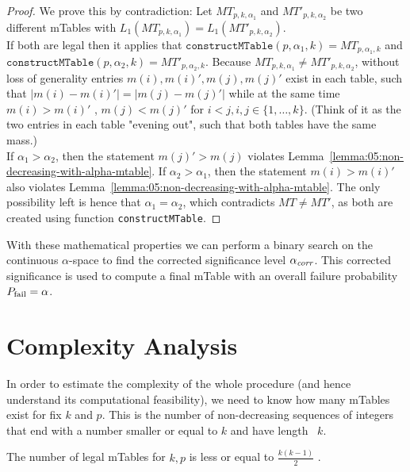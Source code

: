 \begin{proof}
	\label{proof:05:mtable-mass-injection}
	We prove this by contradiction: Let $MT_{p,k,\alpha_1}$ and $MT'_{p,k, \alpha_2}$ be two different mTables with $L_1(MT_{p,k,\alpha_1 }) = L_1(MT'_{p,k,\alpha_2})$.\\
	If both are legal then it applies that $\texttt{constructMTable}(p,\alpha_1 ,k)=MT_{p,\alpha_1 ,k}$
	and \\ $\texttt{constructMTable}(p,\alpha_2 ,k)=MT'_{p,\alpha_2 ,k}$.
	Because $MT_{p,k,\alpha_1} \neq MT'_{p,k,\alpha_2}$, without loss of generality entries $m(i), m(i)' , m(j) , m(j)'$ exist in each table, such that $|m(i) - m(i)'| = |m(j) - m(j)'|$ while at the same time $m(i) > m(i)'$ , $m(j) < m(j)'$ for $i<j, i,j \in \lbrace 1, \ldots , k \rbrace$.
	(Think of it as the two entries in each table "evening out", such that both tables have the same mass.)\\
	If $\alpha_1 > \alpha_2$, then the statement $m(j)' > m(j)$ violates Lemma~\ref{lemma:05:non-decreasing-with-alpha-mtable}.
	If $\alpha_2 > \alpha_1$, then the statement $m(i) > m(i)'$ also violates Lemma~\ref{lemma:05:non-decreasing-with-alpha-mtable}.
	The only possibility left is hence that $\alpha_1 = \alpha_2$, which contradicts $MT \neq MT'$, as both are created using function \texttt{constructMTable}.
\end{proof}
%
With these mathematical properties we can perform a binary search on the continuous $\alpha$-space to find the corrected significance level $\alpha_\textit{corr}$.
%
This corrected significance is used to compute a final mTable with an overall failure probability $P_{\operatorname{fail}} = \alpha$.


\section{Complexity Analysis}

In order to estimate the complexity of the whole procedure (and hence understand its computational feasibility), we need to know how many mTables exist for fix $k$ and $p$.
%
This is the number of non-decreasing sequences of integers that end with a number smaller or equal to $k$ and have length~ $k$.
%
\begin{theorem}
	\label{theorem:05:number-of-mtables}
	The number of legal mTables for $k,p$ is less or equal to $\frac{k(k-1)}{2}$ .
\end{theorem}

